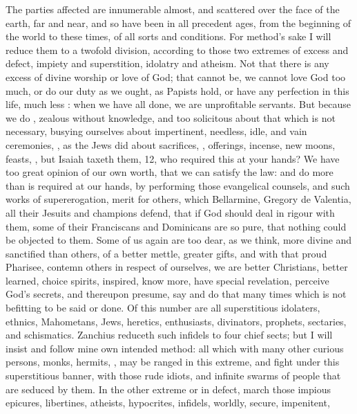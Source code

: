 {The parties affected are innumerable almost, and scattered over the
face of the earth, far and near, and so have been in all precedent
ages, from the beginning of the world to these times, of all sorts and
conditions. For method's sake I will reduce them to a twofold division,
according to those two extremes of excess and defect, impiety and
superstition, idolatry and atheism. Not that there is any excess of
divine worship or love of God; that cannot be, we cannot love God too
much, or do our duty as we ought, as Papists hold, or have any
perfection in this life, much less : when we have all done,
we are unprofitable servants. But because we do , zealous
without knowledge, and too solicitous about that which is not
necessary, busying ourselves about impertinent, needless, idle, and
vain ceremonies, , as the Jews did about sacrifices,
, offerings, incense, new moons, feasts, \etc{}, but Isaiah
taxeth them,  12, who required this at your hands? We have too great
opinion of our own worth, that we can satisfy the law: and do more than
is required at our hands, by performing those evangelical counsels, and
such works of supererogation, merit for others, which Bellarmine,
Gregory de Valentia, all their Jesuits and champions defend, that if
God should deal in rigour with them, some of their Franciscans and
Dominicans are so pure, that nothing could be objected to them. Some of
us again are too dear, as we think, more divine and sanctified than
others, of a better mettle, greater gifts, and with that proud
Pharisee, contemn others in respect of ourselves, we are better
Christians, better learned, choice spirits, inspired, know more, have
special revelation, perceive God's secrets, and thereupon presume, say
and do that many times which is not befitting to be said or done. Of
this number are all superstitious idolaters, ethnics, Mahometans, Jews,
heretics, enthusiasts, divinators, prophets, sectaries, and
schismatics. Zanchius reduceth such infidels to four chief sects; but I
will insist and follow mine own intended method: all which with many
other curious persons, monks, hermits, \etc{}, may be ranged in this
extreme, and fight under this superstitious banner, with those rude
idiots, and infinite swarms of people that are seduced by them. In the
other extreme or in defect, march those impious epicures, libertines,
atheists, hypocrites, infidels, worldly, secure, impenitent,
}
